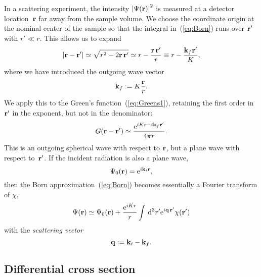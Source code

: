 In a scattering experiment,
the intensity ${|\Psi(\mathbf{r})|}^2$ is measured
at a detector location~$\mathbf{r}$
far away from the sample volume.
We choose the coordinate origin at the nominal center of the sample
so that the integral in~(\ref{eq:Born}) runs over $\mathbf{r'}$ with $r'\ll r$.
This allows us to expand
\begin{equation}
  \left|\mathbf{r}-\mathbf{r'}\right|
  \simeq \sqrt{r^2-2\mathbf{r}\,\mathbf{r'}}
  \simeq r - \frac{\mathbf{r}\,\mathbf{r'}}{r}
  \equiv r - \frac{\mathbf{k}_f \mathbf{r'}}{K},
\end{equation}
where we have introduced the outgoing wave vector
\begin{equation}
  \mathbf{k}_f:=K\frac{\mathbf{r}}{r}.
\end{equation}
We apply this to the Green's function~(\ref{eq:Greens1}),
retaining the first order in $\mathbf{r'}$ in the exponent,
but not in the denominator:
\begin{equation}
  G(\mathbf{r}-\mathbf{r'})
  \simeq\frac{{\rm e}^{iKr - i\mathbf{k}_f \mathbf{r'}}}{4\pi r}.
\end{equation}
This is an outgoing spherical wave with respect to $\mathbf{r}$,
but a plane wave with respect to~$\mathbf{r'}$.
If the incident radiation is also a plane wave,
\begin{equation}\label{eq:Psi0Plane}
  \Psi_0(\mathbf{r})={\rm e}^{i \mathbf{k}_i \mathbf{r}},
\end{equation}
then the Born approximation~(\ref{eq:Born})
becomes essentially a Fourier transform of $\chi$,
\begin{equation}\label{eq:BornPlane}
  \Psi(\mathbf{r})
  \simeq \Psi_0(\mathbf{r})
  + \frac{{\rm e}^{iKr}}{r}
    \int\,{\rm d}^3r' {\rm e}^{i\mathbf{q}\,\mathbf{r'}}\chi(\mathbf{r'})
\end{equation}
with the \textit{scattering vector}
\begin{equation}
  \mathbf{q}:=\mathbf{k}_i-\mathbf{k}_f.
\end{equation}

\subsection{Differential cross section}


